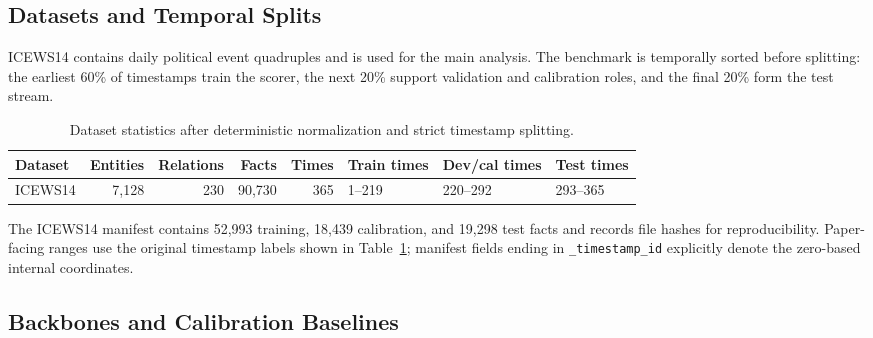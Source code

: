 \documentclass[10pt,twocolumn]{article}
\begin{document}
\subsection{Datasets and Temporal Splits}

ICEWS14 contains daily political event quadruples and is used for the
main analysis. The benchmark is temporally sorted before splitting:
the earliest 60\% of timestamps train the scorer, the next 20\% support
validation and calibration roles, and the final 20\% form the test stream.

\begin{table}[t]
\centering
\caption{Dataset statistics after deterministic normalization and strict
timestamp splitting.}
\label{tab:datasets}
\begin{tabular}{lrrrrlll}
\toprule
Dataset & Entities & Relations & Facts & Times & Train times & Dev/cal times & Test times\\
\midrule
ICEWS14 & 7,128 & 230 & 90,730 & 365 & 1--219 & 220--292 & 293--365\\
\bottomrule
\end{tabular}
\end{table}

The ICEWS14 manifest contains 52,993 training, 18,439 calibration, and 19,298
test facts and records file hashes for reproducibility. Paper-facing ranges use
the original timestamp labels shown in Table~\ref{tab:datasets}; manifest
fields ending in \texttt{\_timestamp\_id} explicitly denote the zero-based
internal coordinates.

\subsection{Backbones and Calibration Baselines}
\end{document}
